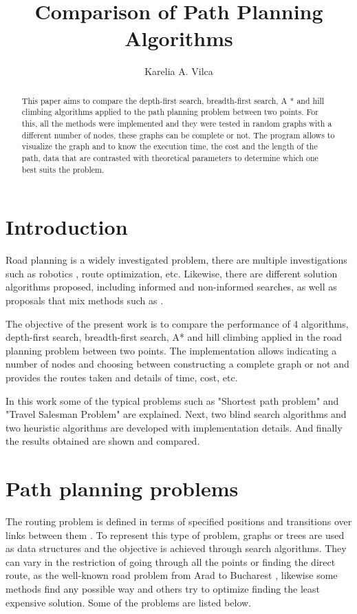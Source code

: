 \documentclass[11pt]{article}
\title{Comparison of Path Planning Algorithms\\ }
\author{Karelia A. Vilca\inst{1}}
\begin{document}
 


\maketitle

\begin{abstract}
This paper aims to compare the depth-first search, breadth-first search, A * and hill climbing algorithms applied to the path planning problem between two points. For this, all the methods were implemented and they were tested in random graphs with a different number of nodes, these graphs can be complete or not. The program allows to visualize the graph and to know the execution time, the cost and the length of the path, data that are contrasted with theoretical parameters to determine which one best suits the problem. 
\end{abstract}
\section{Introduction}
Road planning is a widely investigated problem, there are multiple investigations such as robotics \cite{shwail2013probabilistic}, route optimization, etc. Likewise, there are different solution algorithms proposed, including informed and non-informed searches, as well as proposals that mix methods such as \cite{felner2003kbfs}.

The objective of the present work is to compare the performance of 4 algorithms, depth-first search, breadth-first search, A* and hill climbing applied in the road planning problem between two points. The implementation allows indicating a number of nodes and choosing between constructing a complete graph or not and provides the routes taken and details of time, cost, etc.

In this work some of the typical problems such as "Shortest path problem" and "Travel Salesman Problem" are explained. Next, two blind search algorithms and two heuristic algorithms are developed with implementation details. And finally the results obtained are shown and compared.

\section{Path planning problems}
The routing problem is defined in terms of specified positions and transitions over links between them \cite{russell2004inteligencia}. 
To represent this type of problem, graphs or trees are used as data structures and the objective is achieved through search algorithms.
They can vary in the restriction of going through all the points or finding the direct route, as the well-known road problem from Arad to Bucharest \cite{russell2004inteligencia}, likewise some methods find any possible way and others try to optimize finding the least expensive solution. Some of the problems are listed below.
\end{document}
